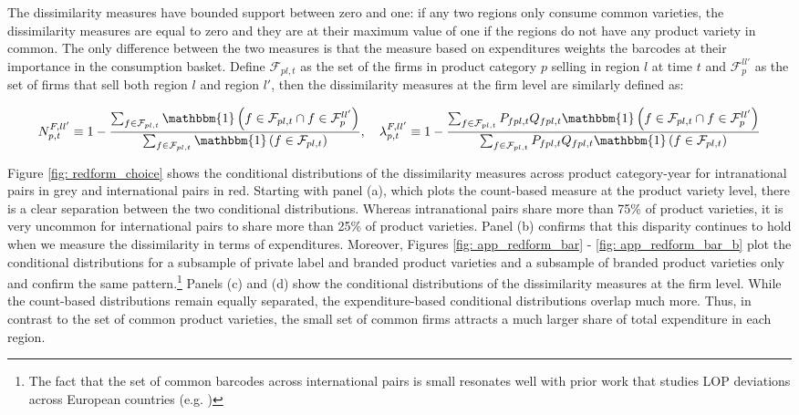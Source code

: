 The dissimilarity measures have bounded support between zero and one: if any two regions only consume common varieties, the dissimilarity measures are equal to zero and they are at their maximum value of one if the regions do not have any product variety in common. The only difference between the two measures is that the measure based on expenditures weights the barcodes at their importance in the consumption basket.  Define $\mathcal{F}_{pl,t}$ as the set of the firms in product category $p$ selling in region $l$ at time $t$ and $\mathcal{F}^{ll'}_{p}$ as the set of firms that sell both region $l$ and region $l'$, then the dissimilarity measures at the firm level are similarly defined as: 
\begin{linenomath*}
    \begin{equation*}
        N^{F,ll'}_{p,t} \equiv 
            1 - \frac{\sum_{f \in \mathcal{F}_{pl,t}} 
                        \mathbbm{1}\left(f \in \mathcal{F}_{pl,t} 
                                            \cap f \in \mathcal{F}^{ll'}_p\right)}
                     {\sum_{f \in \mathcal{F}_{pl,t}} 
                        \mathbbm{1}\left(f \in \mathcal{F}_{pl,t}\right)}, \quad 
        \lambda^{F,ll'}_{p,t} \equiv 
            1 - \frac{\sum_{f \in \mathcal{F}_{pl,t}}P_{fpl,t}Q_{fpl,t} 
                        \mathbbm{1}\left(f \in \mathcal{F}_{pl,t} 
                                            \cap f \in \mathcal{F}^{ll'}_p\right)}
                     {\sum_{f \in \mathcal{F}_{pl,t}}P_{fpl,t}Q_{fpl,t} 
                        \mathbbm{1}\left(f \in \mathcal{F}_{pl,t}\right)}
    \end{equation*}
    \end{linenomath*}
Figure \ref{fig: redform_choice} shows the conditional distributions of the dissimilarity measures across product category-year for intranational pairs in grey and international pairs in red. Starting with panel (a), which plots the count-based measure at the product variety level, there is a clear separation between the two conditional distributions. Whereas intranational pairs share more than 75\% of product varieties, it is very uncommon for international pairs to share more than 25\% of product varieties. Panel (b) confirms that this disparity continues to hold when we measure the dissimilarity in terms of expenditures. Moreover, Figures \ref{fig: app_redform_bar} - \ref{fig: app_redform_bar_b} plot the conditional distributions for a subsample of private label and branded product varieties and a subsample of branded product varieties only and confirm the same pattern.\footnote{The fact that the set of common barcodes across international pairs is small resonates well with prior work that studies LOP deviations across European countries (e.g. \citet{Cavallo2014, Beck2020})} Panels (c) and (d) show the conditional distributions of the dissimilarity measures at the firm level. While the count-based distributions remain equally separated, the expenditure-based conditional distributions overlap much more. Thus, in contrast to the set of common product varieties, the small set of common firms attracts a much larger share of total expenditure in each region. 
